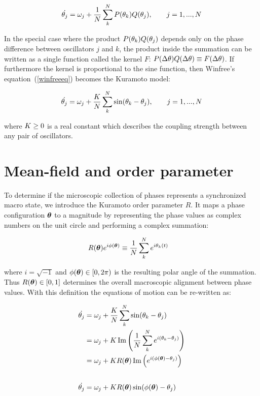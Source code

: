 \begin{equation}
    \dot{\theta_j} = \omega_j + \frac{1}{N}\sum^{N}_{k}P(\theta_k)Q(\theta_j), \qquad j=1,...,N
    \label{winfreeeq}
\end{equation}

In the special case where the product $P(\theta_k)Q(\theta_j)$ depends only on the phase difference between oscillators $j$ and $k$,
the product inside the summation can be written as a single function called the kernel $F$: $P(\Delta \theta)Q(\Delta \theta) \equiv
F(\Delta \theta)$. If furthermore the kernel is proportional to the sine function, then Winfree's equation~(\ref{winfreeeq}) becomes
the Kuramoto model:

\begin{equation}
    \dot{\theta_j} = \omega_j + \frac{K}{N}\sum^{N}_{k}\sin(\theta_k - \theta_j), \qquad j=1,...,N
    \label{kura}
\end{equation}

\noindent where $K \geq 0$ is a real constant which describes the coupling strength between any pair of oscillators.

\section{Mean-field and order parameter}

To determine if the microscopic collection of phases represents a synchronized macro state, we introduce the Kuramoto order parameter
$R$. It maps a phase configuration $\bm{\theta}$ to a magnitude by representing the phase values as complex numbers on the unit circle
and performing a complex summation:

\begin{align}
    R(\bm{\theta})e^{i\phi(\bm{\theta})} &\equiv \frac{1}{N} \sum^{N}_{k} e^{i\theta_k(t)}
    \label{kuramotoop}
\end{align}

\noindent where $i=\sqrt{-1}$ and $\phi(\bm{\theta})\in[0,2\pi)$ is the resulting polar angle of the summation. Thus $R( \bm{\theta})
\in [0,1]$ determines the overall macroscopic alignment between phase values. With this definition the equations of motion can be
re-written as:

\begin{align}
    \dot{\theta_j} &= \omega_j + \frac{K}{N}\sum^{N}_{k}\sin(\theta_k - \theta_j) \notag \\
                   &= \omega_j + K \operatorname{Im}\left( \frac{1}{N}\sum^{N}_{k} e^{i(\theta_k-\theta_j)} \right) \notag \\
                   &= \omega_j + K R(\bm{\theta}) \operatorname{Im}\left( e^{i(\phi(\bm{\theta}) - \theta_j)} \right) \notag \\[18pt]
    \dot{\theta_j} &= \omega_j + K R(\bm{\theta}) \sin ( \phi(\bm{\theta}) - \theta_j )
    \label{kuramf}
\end{align}

